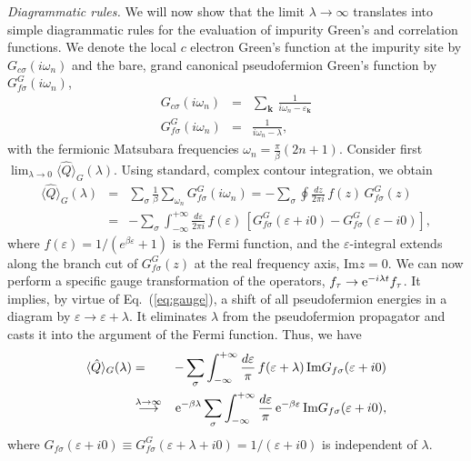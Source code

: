 \documentclass[12pt,twoside]{article}
\newcommand{\im}{\text{Im}}
\newcommand{\Eq}[1]{Eq.~(\ref{#1})}
\begin{document}
\textit{Diagrammatic rules.}  
We will now show that the limit $\lambda\to\infty$ translates into 
simple diagrammatic rules for the evaluation of impurity Green's and 
correlation functions. 
We denote the local $c$ electron Green's function at the impurity site by
$G_{c\sigma}(i\omega_n)$ and the bare, grand canonical pseudofermion Green's 
function by $G_{f\sigma}^G(i\omega_n)$,
\begin{eqnarray}  
G_{c\sigma}(i\omega_n)&=&\sum_{\mathbf{k}}\,
\frac{1}{i\omega_n-\varepsilon_{\mathbf{k}}}
\label{eq:Gc}\\
G_{f\sigma}^G(i\omega_n)&=&\frac{1}{i\omega_n-\lambda},
\label{eq:Gf}
\end{eqnarray}  
with the fermionic Matsubara frequencies $\omega_n=\frac{\pi}{\beta}(2n+1)$. 
Consider first $\lim_{\lambda\to 0}\langle\hat{Q}\rangle_G(\lambda)$. 
Using standard, complex contour integration, we obtain 
\begin{eqnarray}
\langle\hat{Q}\rangle_G(\lambda) &=& 
\sum_{\sigma} \frac{1}{\beta} \sum_{\omega_n} G_{f\sigma}^G(i\omega_n) =
-\sum_{\sigma} \oint \frac{dz}{2\pi i}\, f(z)\, 
G_{f\sigma}^{G}(z) \nonumber\\
&=&
-\sum_{\sigma} \int_{-\infty}^{+\infty} \frac{d\varepsilon}{2\pi i}\,f(\varepsilon)\,
\left[ G_{f\sigma}^{G}(\varepsilon +i0) - G_{f\sigma}^{G}(\varepsilon -i0) \right],
\label{eq:contourint1}
\end{eqnarray}
where $f(\varepsilon)=1/(e^{\beta\varepsilon}+1)$ is the Fermi function, and
the $\varepsilon$-integral extends along the branch cut 
of $G_{f\sigma}^{G}(z)$ at the real frequency axis, $\im z=0$.  
We can now perform a specific gauge transformation of the operators,
$f_{\tau}\to {\rm e}^{-i\lambda t}f_{\tau}$. It implies, by virtue of
\Eq{eq:gauge}, a shift of all pseudofermion energies in a 
diagram by $\varepsilon\to\varepsilon +\lambda$. It
eliminates $\lambda$ from the pseudofermion propagator and casts it into 
the argument of the Fermi function. Thus, we have
\begin{eqnarray}
\langle\hat{Q}\rangle_G(\lambda) &=& 
-\sum_{\sigma} \int_{-\infty}^{+\infty} \frac{d\varepsilon}{\pi }\, 
f(\varepsilon+\lambda)\,\im G_{f\sigma}(\varepsilon +i0)  \nonumber \\
&\stackrel{\lambda\to\infty}{\longrightarrow}&
{\rm e}^{-\beta\lambda}\sum_{\sigma} 
\int_{-\infty}^{+\infty} \frac{d\varepsilon}{\pi }\, 
{\rm e}^{-\beta\varepsilon}\,\im G_{f\sigma}(\varepsilon +i0),
\label{eq:contourint2} 
\end{eqnarray}
where $G_{f\sigma}(\varepsilon +i0)\equiv 
G_{f\sigma}^G(\varepsilon+\lambda +i0)=1/(\varepsilon+i0)$
is independent of $\lambda$. 
\end{document}
